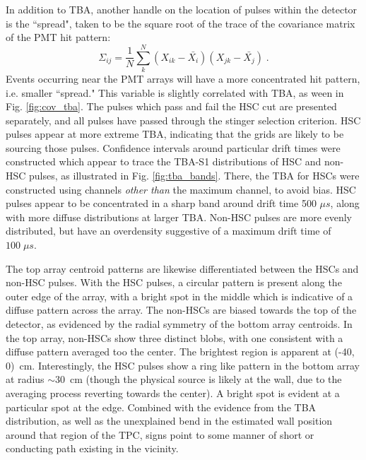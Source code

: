 In addition to TBA, another handle on the location of pulses within the detector is the ``spread", taken to be the square root of the trace of the covariance matrix of the PMT hit pattern:
\begin{equation}
    \Sigma_{ij} = \frac{1}{N}\sum_k^N (X_{ik} - \bar{X_i})(X_{jk}-\bar{X_{j}})
    \label{eq:covar}\;.
\end{equation}
\noindent
Events occurring near the PMT arrays will have a more concentrated hit pattern, i.e. smaller ``spread."
This variable is slightly correlated with TBA, as ween in Fig. \ref{fig:cov_tba}.
The pulses which pass and fail the HSC cut are presented separately, and all pulses have passed through the stinger selection criterion.
HSC pulses appear at more extreme TBA, indicating that the grids are likely to be sourcing those pulses.
Confidence intervals around particular drift times were constructed which appear to trace the TBA-S1 distributions of HSC and non-HSC pulses, as illustrated in Fig. \ref{fig:tba_bands}.
There, the TBA for HSCs were constructed using channels \textit{other than} the maximum channel, to avoid bias.
HSC pulses appear to be concentrated in a sharp band around drift time 500 $\mu s$, along with more diffuse distributions at larger TBA.
Non-HSC pulses are more evenly distributed, but have an overdensity suggestive of a maximum drift time of $100\;\mu s$.

The top array centroid patterns are likewise differentiated between the HSCs and non-HSC pulses. 
With the HSC pulses, a circular pattern is present along the outer edge of the array, with a bright spot in the middle which is indicative of a diffuse pattern across the array.
The non-HSCs are biased towards the top of the detector, as evidenced by the radial symmetry of the bottom array centroids.
In the top array, non-HSCs show three distinct blobs, with one consistent with a diffuse pattern averaged too the center.
The brightest region is apparent at (-40, 0)~cm.
Interestingly, the HSC pulses show a ring like pattern in the bottom array at radius $\sim 30$~cm (though the physical source is likely at the wall, due to the averaging process reverting towards the center).
A bright spot is evident at a particular spot at the edge.
Combined with the evidence from the TBA distribution, as well as the unexplained bend in the estimated wall position around that region of the TPC, signs point to some manner of short or conducting path existing in the vicinity.

